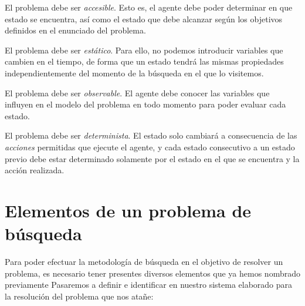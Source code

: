 El problema debe ser \emph{accesible}. Esto es, el agente debe poder determinar en que estado se encuentra, así como el estado que debe alcanzar según los objetivos definidos en el enunciado del problema.

El problema debe ser \emph{estático}. Para ello, no podemos introducir variables que cambien en el tiempo, de forma que un estado tendrá las mismas propiedades independientemente del momento de la búsqueda en el que lo visitemos.

El problema debe ser \emph{observable}. El agente debe conocer las variables que influyen en el modelo del problema en todo momento para poder evaluar cada estado.

El problema debe ser \emph{determinista}. El estado solo cambiará a consecuencia de las \emph{acciones} permitidas que ejecute el agente, y cada estado consecutivo a un estado previo debe estar determinado solamente por el estado en el que se encuentra y la acción realizada.


\section{Elementos de un problema de búsqueda}

Para poder efectuar la metodología de búsqueda en el objetivo de resolver un problema, es necesario tener presentes diversos elementos que ya hemos nombrado previamente Pasaremos a definir e identificar en nuestro sistema elaborado para la resolución del problema que nos atañe:

